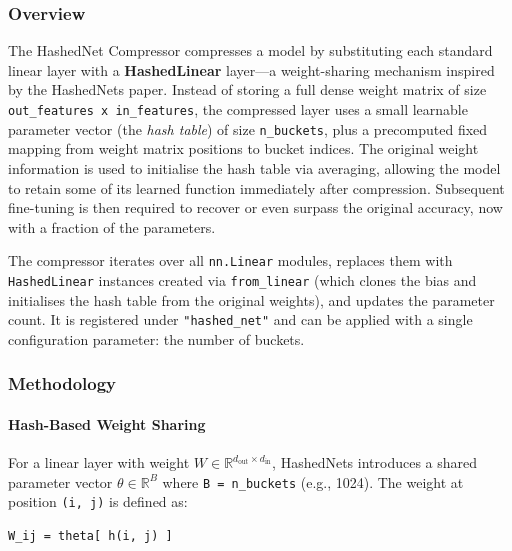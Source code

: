 \subsubsection*{Overview}

The HashedNet Compressor compresses a model by substituting each standard linear layer with a \textbf{HashedLinear} layer---a weight-sharing mechanism inspired by the HashedNets paper. Instead of storing a full dense weight matrix of size \texttt{out\_features x in\_features}, the compressed layer uses a small learnable parameter vector (the \textit{hash table}) of size \texttt{n\_buckets}, plus a precomputed fixed mapping from weight matrix positions to bucket indices. The original weight information is used to initialise the hash table via averaging, allowing the model to retain some of its learned function immediately after compression. Subsequent fine-tuning is then required to recover or even surpass the original accuracy, now with a fraction of the parameters.

The compressor iterates over all \texttt{nn.Linear} modules, replaces them with \texttt{HashedLinear} instances created via \texttt{from\_linear} (which clones the bias and initialises the hash table from the original weights), and updates the parameter count. It is registered under \texttt{"hashed\_net"} and can be applied with a single configuration parameter: the number of buckets.


\subsubsection*{Methodology}

\paragraph{Hash-Based Weight Sharing}

For a linear layer with weight $W \in \mathbb{R}^{d_{\text{out}} \times d_{\text{in}}}$, HashedNets introduces a shared parameter vector $\theta \in \mathbb{R}^B$ where \texttt{B = n\_buckets} (e.g., 1024). The weight at position \texttt{(i, j)} is defined as:

\vspace{0.5em}
\begin{mdframed}[backgroundcolor=codebg, linecolor=codeframe, linewidth=1pt, roundcorner=4pt, innerleftmargin=2pt, innerrightmargin=5pt, innertopmargin=5pt, innerbottommargin=5pt]
\begin{lstlisting}
W_ij = theta[ h(i, j) ]
\end{lstlisting}
\end{mdframed}
\vspace{0.5em}

